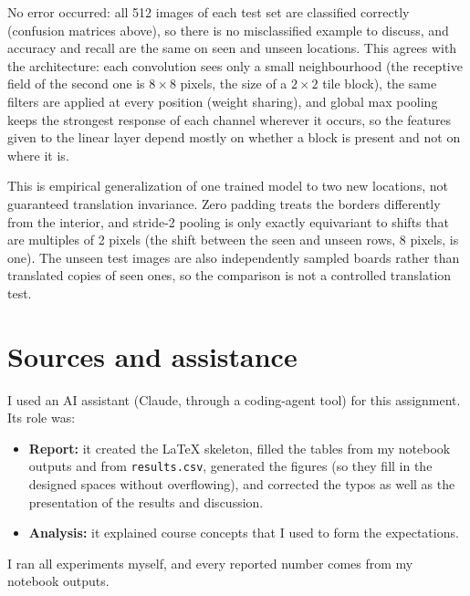 \documentclass[12pt]{article}
\theoremstyle{definition}
\begin{document}
{\begin{enumerate}[label=\textbf{2.2.\arabic*}, leftmargin=*]
No error occurred: all 512 images of each test set are classified correctly (confusion matrices above), so there is no misclassified example to discuss, and accuracy and recall are the same on seen and unseen locations. This agrees with the architecture: each convolution sees only a small neighbourhood (the receptive field of the second one is $8\times8$ pixels, the size of a $2\times2$ tile block), the same filters are applied at every position (weight sharing), and global max pooling keeps the strongest response of each channel wherever it occurs, so the features given to the linear layer depend mostly on whether a block is present and not on where it is.

This is empirical generalization of one trained model to two new locations, not guaranteed translation invariance. Zero padding treats the borders differently from the interior, and stride-2 pooling is only exactly equivariant to shifts that are multiples of 2 pixels (the shift between the seen and unseen rows, 8 pixels, is one). The unseen test images are also independently sampled boards rather than translated copies of seen ones, so the comparison is not a controlled translation test.

\end{enumerate}
}

\section*{Sources and assistance}
   I used an AI assistant (Claude, through a coding-agent tool) for this assignment. Its role was:
   \begin{itemize}[leftmargin=*, itemsep=2pt, topsep=2pt]
   \item \textbf{Report:} it created the LaTeX skeleton, filled the tables from my notebook outputs
 and from \texttt{results.csv}, generated the figures (so they fill in the designed spaces without overflowing),
  and corrected the typos as well as the presentation of the results and discussion.
   \item \textbf{Analysis:} it explained course concepts that I used to form the expectations.
   \end{itemize}
   I ran all experiments myself, and every reported number comes from my notebook outputs.
\end{document}
